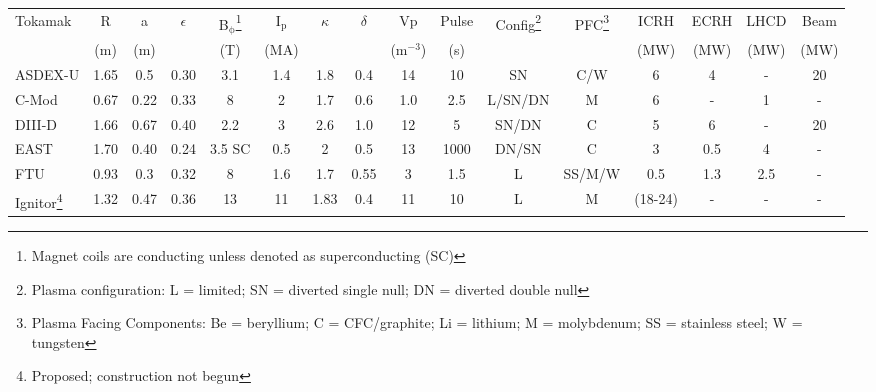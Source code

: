 \begin{sidewaystable}[ht]\footnotesize
  \centering
  \begin{tabular}{l c c c c c c c c c c c c c c c}
    \hline
    Tokamak\T&  R  &  a  &  $\epsilon$  &  B$_\mathrm{\phi}$\footnote{\scriptsize Magnet coils are conducting unless denoted as superconducting (SC)} &  I$_\mathrm{p}$  &  $\kappa$  &  $\delta$  &  V$\mathrm{p}$  &  Pulse   &  Config\footnote{\scriptsize Plasma configuration: L = limited; SN = diverted single null; DN = diverted double null}  &  PFC\footnote{\scriptsize Plasma Facing Components: Be = beryllium; C = CFC/graphite; Li = lithium; M = molybdenum; SS = stainless steel; W = tungsten}  &  ICRH  &  ECRH  & LHCD  &  Beam \\
           \B& (m) & (m) &              &  (T)                                                                                                  &  (MA)            &            &            &  (m$^{-3}$)     &  (s)     &                                                                                        &                                                                                                                                                                &  (MW)  &  (MW)  & (MW)  &  (MW) \\
    \hline\hline

    ASDEX-U \T\B& 1.65 & 0.5 & 0.30 & 3.1 & 1.4 & 1.8 & 0.4 & 14 & 10& SN & C/W & 6 & 4 & -& 20 \\    

    \rowcolor[gray]{0.9}
    C-Mod   \T\B& 0.67 & 0.22 & 0.33 & 8 & 2 & 1.7 & 0.6 & 1.0 & 2.5 & L/SN/DN & M & 6 & - & 1 &-\\

    DIII-D  \T\B& 1.66 & 0.67 & 0.40 & 2.2 & 3 & 2.6& 1.0&12 &5 & SN/DN & C & 5 & 6 & - & 20\\ %
    
    \rowcolor[gray]{0.9}
    EAST    \T\B& 1.70 & 0.40 & 0.24 & 3.5 SC & 0.5 & 2 & 0.5 & 13 & 1000 & DN/SN & C & 3 & 0.5 & 4 &-\\

    FTU     \T\B& 0.93 & 0.3 & 0.32 & 8 & 1.6 & 1.7 & 0.55 & 3  & 1.5 & L & SS/M/W & 0.5 & 1.3 & 2.5 & -\\ %

    \rowcolor[gray]{0.9}
    Ignitor\footnote{\scriptsize Proposed; construction not begun} \T\B& 1.32 & 0.47 & 0.36 & 13& 11& 1.83& 0.4&11 & 10 & L & M & (18-24) & - & - & -\\


\end{tabular}
\end{sidewaystable}
